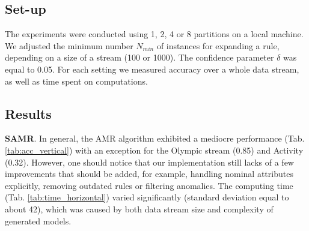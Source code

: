 \documentclass[journal]{IEEEtran}
\begin{document}
\subsection{Set-up}

The experiments were conducted using 1, 2, 4 or 8 partitions on a local machine. We adjusted the minimum number $N_{min}$ of instances for expanding a rule, depending on a size of a stream (100 or 1000). The confidence parameter $\delta$ was equal to 0.05. For each setting we measured accuracy over a whole data stream, as well as time spent on computations.

\subsection{Results}

\noindent\textbf{SAMR}. In general, the AMR algorithm exhibited a mediocre performance (Tab. \ref{tab:acc_vertical}) with an exception for the Olympic stream (0.85) and Activity (0.32). However, one should notice that our implementation still lacks of a few improvements that should be added, for example, handling nominal attributes explicitly, removing outdated rules or filtering anomalies. The computing time (Tab. \ref{tab:time_horizontal}) varied significantly (standard deviation equal to about 42), which was caused by both data stream size and complexity of generated models.
\end{document}
